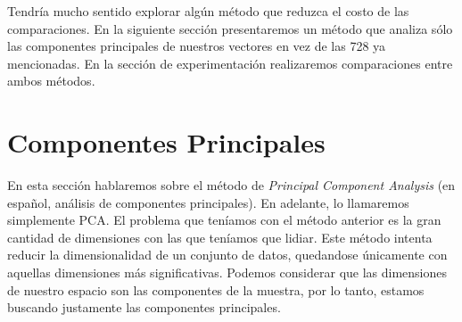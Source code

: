 Tendría mucho sentido explorar algún método que reduzca el costo de las comparaciones. En la siguiente sección presentaremos un método que analiza sólo las componentes principales de nuestros vectores en vez de las 728 ya mencionadas. En la sección de experimentación realizaremos comparaciones entre ambos métodos. \\


\newpage
\section{Componentes Principales}

En esta sección hablaremos sobre el método de \textit{Principal Component Analysis} (en español, análisis de componentes principales). En adelante, lo llamaremos simplemente PCA. El problema que teníamos con el método anterior es la gran cantidad de dimensiones con las que teníamos que lidiar. Este método intenta reducir la dimensionalidad de un conjunto de datos, quedandose únicamente con aquellas dimensiones más significativas. Podemos considerar que las dimensiones de nuestro espacio son las componentes de la muestra, por lo tanto, estamos buscando justamente las componentes principales. \\


